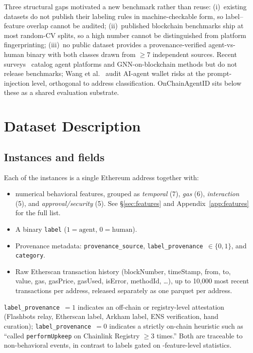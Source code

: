 \documentclass[10pt]{article}
\begin{document}
Three structural gaps motivated a new benchmark rather than reuse: (i)~existing datasets do not publish their labeling rules in machine-checkable form, so label--feature overlap cannot be audited; (ii)~published blockchain benchmarks ship at most random-CV splits, so a high number cannot be distinguished from platform fingerprinting; (iii)~no public dataset provides a provenance-verified agent-vs-human binary with both classes drawn from $\geq 7$ independent sources. Recent surveys~\cite{he2026agentsurvey,shamsi2023gnnsurvey} catalog agent platforms and GNN-on-blockchain methods but do not release benchmarks; Wang et al.~\cite{wang2024airisks} audit AI-agent wallet risks at the prompt-injection level, orthogonal to address classification. OnChainAgentID sits below these as a shared evaluation substrate.

\section{Dataset Description}
\label{sec:dataset}

\subsection{Instances and fields}

Each of the \datasetNAddresses{} instances is a single Ethereum address together with:
\begin{itemize}
    \item \datasetNFeatures{} numerical behavioral features, grouped as \emph{temporal} (7), \emph{gas} (6), \emph{interaction} (5), and \emph{approval/security} (5). See \S\ref{sec:features} and Appendix~\ref{app:features} for the full list.
    \item A binary \texttt{label} ($1 = \text{agent}$, $0 = \text{human}$).
    \item Provenance metadata: \texttt{provenance\_source}, \texttt{label\_provenance}~$\in\{0,1\}$, and \texttt{category}.
    \item Raw Etherscan transaction history (blockNumber, timeStamp, from, to, value, gas, gasPrice, gasUsed, isError, methodId, \ldots), up to 10{,}000 most recent transactions per address, released separately as one parquet per address.
\end{itemize}

\texttt{label\_provenance}~$=1$ indicates an off-chain or registry-level attestation (Flashbots relay, Etherscan label, Arkham label, ENS verification, hand curation); \texttt{label\_provenance}~$=0$ indicates a strictly on-chain heuristic such as ``called \texttt{performUpkeep} on Chainlink Registry $\geq 3$ times.'' Both are traceable to non-behavioral events, in contrast to labels gated on \datasetNFeatures{}-feature-level statistics.
\end{document}
